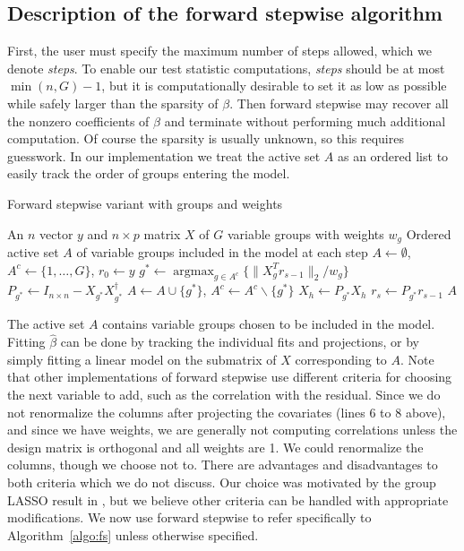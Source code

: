 \documentclass{imsart}
\newcommand{\argmax}{\mathop{\mathrm{argmax}}}
\newcommand{\norm}[1]{\lVert #1 \rVert}
\begin{document}
\subsection{Description of the forward stepwise algorithm}

First, the user must specify the maximum number of steps allowed,
which we denote \textit{steps}.
To enable our test statistic computations,
\textit{steps} should be at most $\min (n, G) - 1$, but it is
computationally desirable to set it as low as possible while
safely larger than the sparsity of $\beta$. 
Then forward stepwise may recover all the nonzero
coefficients of $\beta$ and terminate without performing much
additional computation.
Of course the sparsity is usually unknown, so this requires guesswork.
In our implementation we treat the active set $A$ as an ordered list to easily track the order of groups entering the model.

\begin{algorithm}
  \caption{Forward stepwise variant with groups and weights}
  \label{algo:fs}
  \begin{algorithmic}[1]
    \REQUIRE An $n$ vector $y$ and $n \times p$ matrix $X$ of $G$ variable groups with weights $w_g$
    \ENSURE Ordered active set $A$ of variable groups included in the model at each step
    \STATE $A \gets \emptyset$, $A^c \gets \{ 1, \ldots, G\}$, $r_0 \gets y$
    \STATE $g^* \gets \argmax_{g \in A^c} \{ \norm{X_g^Tr_{s-1}}_2 / w_g \}$
    \STATE $P_{g^*} \gets I_{n\times n} - X_{g^*}X_{g^*}^\dagger$
    \STATE $A \gets A \cup \{ g^* \}$, $A^c \gets A^c \backslash \{ g^* \}$
      \STATE $X_h \gets P_{g^*} X_h$
    \ENDFOR
    \STATE $r_s \gets P_{g^*} r_{s-1}$
    \ENDFOR
    \RETURN $A$
  \end{algorithmic}
\end{algorithm}

The active set $A$ contains variable groups chosen to be included in
the model. Fitting $\hat \beta$ can be done by tracking the individual
fits and projections, or by simply fitting a linear model on the submatrix
of $X$ corresponding to $A$. 
 Note that other
implementations of forward stepwise use different criteria for choosing
the next variable to add, such as the correlation with the residual.
Since we do not renormalize the columns after projecting the covariates
(lines 6 to 8 above), and since we have weights, we are generally not computing
correlations unless the design matrix is orthogonal and all weights are 1. We could
renormalize the columns, though we choose not to.
There are advantages and disadvantages to both criteria which we do not
discuss. Our choice was motivated by the group LASSO result in
\cite{tests:adaptive}, but we believe other criteria can be handled
with appropriate modifications.
We now use forward stepwise to refer specifically to
Algorithm~\ref{algo:fs} unless otherwise specified.
\end{document}
